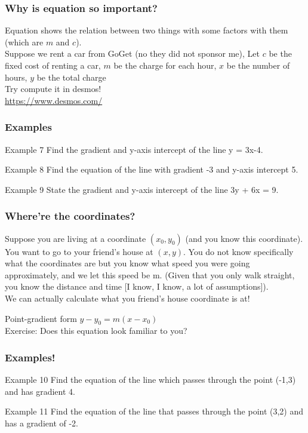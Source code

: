 \documentclass{beamer}
\begin{document}
\begin{frame}
    \frametitle{Why is equation so important?}
    Equation shows the relation between two things with some factors with them (which are $m$ and $c$).\\
    Suppose we rent a car from GoGet (no they did not sponsor me), Let $c$ be the fixed cost of renting a car, $m$ be the charge for each hour, $x$ be the number of hours, $y$ be the total charge\\
    Try compute it in desmos!\\
    \url{https://www.desmos.com/}
\end{frame}

\begin{frame}[t]
    \frametitle{Examples}
    \begin{block}{Example 7}
        Find the gradient and y-axis intercept of the line y = 3x-4.
    \end{block}
    \begin{block}{Example 8}
        Find the equation of the line with gradient -3 and y-axis intercept 5.
    \end{block}
    \begin{block}{Example 9}
        State the gradient and y-axis intercept of the line 3y + 6x = 9.
    \end{block}
\end{frame}
\begin{frame}
\end{frame}

\begin{frame}
    \frametitle{Where're the coordinates?}
    Suppose you are living at a coordinate $(x_0, y_0)$ (and you know this coordinate). You want to go to your friend's house at $(x,y)$. You do not know specifically what the coordinates are 
    but you know what speed you were going approximately, and we let this speed be m. (Given that you only walk straight, you know the distance and time [I know, I know, a lot of assumptions]).\\
    We can actually calculate what you friend's house coordinate is at!
    \begin{block}{Point-gradient form}
        $y-y_0 = m(x-x_0)$\\
        Exercise: Does this equation look familiar to you?
    \end{block}
\end{frame}

\begin{frame}
    \frametitle{Examples!}
    \begin{block}{Example 10}
        Find the equation of the line which passes through the point (-1,3) and has gradient 4.
    \end{block}
    \begin{block}{Example 11}
        Find the equation of the line that passes through the point (3,2) and has a gradient of -2.
    \end{block}
\end{frame}
\begin{frame}
\end{frame}
\end{document}
